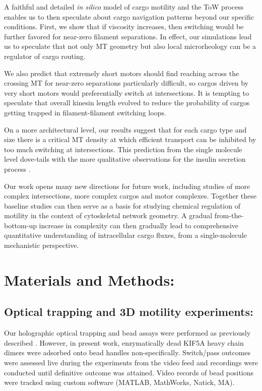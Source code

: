 A faithful and detailed \textit{in silico} model of cargo motility and the ToW process enables us to then speculate about cargo navigation patterns beyond our specific conditions. First, we show that if viscosity increases, then switching would be further favored for near-zero filament separations. In effect, our simulations lead us to speculate that not only MT geometry but also local microrheology can be a regulator of cargo routing.

We also predict that extremely short motors should find reaching across the crossing MT for near-zero separations particularly difficult, so cargos driven by very short motors would preferentially switch at intersections. It is tempting to speculate that overall kinesin length evolved to reduce the probability of cargos getting trapped in filament-filament switching loops.

On a more architectural level, our results suggest that for each cargo type and size there is a critical MT density at which efficient transport can be inhibited by too much switching at intersections. This prediction from the single molecule level dove-tails with the more qualitative observations for the insulin secretion process \cite{Zhu2015}.

Our work opens many new directions for future work, including studies of more complex intersections, more complex cargos and motor complexes. Together these baseline studies can then serve as a basis for studying chemical regulation of motility in the context of cytoskeletal network geometry. A gradual from-the-bottom-up increase in complexity can then gradually lead to comprehensive quantitative understanding of intracellular cargo fluxes, from a single-molecule mechanistic perspective.

\section{Materials and Methods:}

\subsection{Optical trapping and 3D motility experiments:}

Our holographic optical trapping and bead assays were performed as previously described \cite{Bergman2015}. However, in present work, enzymatically dead KIF5A heavy chain dimers were adsorbed onto bead handles non-specifically. Switch/pass outcomes were assessed live during the experiments from the video feed and recordings were conducted until definitive outcome was attained. Video records of bead positions were tracked using custom software (MATLAB, MathWorks, Natick, MA).

